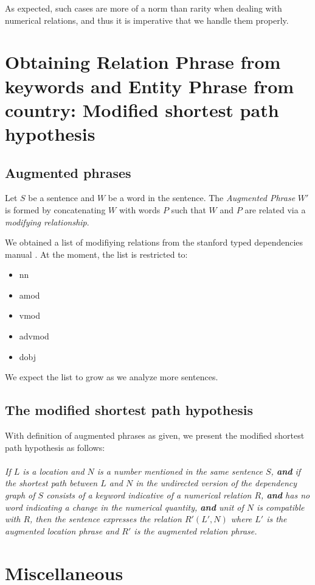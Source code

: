 \documentclass[a4paper,10pt]{article}
\begin{document}
As expected, such cases are more of a norm than rarity when dealing with numerical relations, and thus it is imperative that we handle them 
properly.

\section{Obtaining Relation Phrase from keywords and Entity Phrase from country: Modified shortest path hypothesis}

\subsection{Augmented phrases}
Let $S$ be a sentence and $W$ be a word in the sentence. The \emph{Augmented Phrase} $W'$ is formed by concatenating $W$ with words $P$ such that
$W$ and $P$ are related via a \emph{modifying relationship}.

We obtained a list of modifiying relations from the stanford typed dependencies manual \cite{de2008stanford}.
At the moment, the list is restricted to:
\begin{itemize}
\item nn
\item amod
\item vmod
\item advmod
\item dobj
\end{itemize}
We expect the list to grow as we analyze more sentences.

\subsection{The modified shortest path hypothesis}
With definition of augmented phrases as given, we present the modified shortest path hypothesis as follows:
\\
\\
\emph{If $L$ is a location and $N$ is a number mentioned in the same
sentence $S$, \textbf{and} if the shortest path between $L$ and $N$ in the undirected version of the dependency graph of $S$ consists of a keyword 
indicative of a numerical relation $R$, \textbf{and} has no word indicating a change in the numerical quantity, \textbf{and} unit of $N$ is compatible with $R$,
then the sentence expresses the relation \textbf{\color{blue} $R'(L', N)$} where $L'$ is the augmented location phrase and $R'$ is the augmented relation phrase.}

\section{Miscellaneous}
\end{document}
